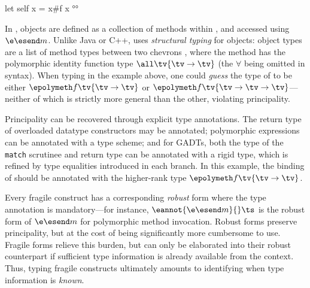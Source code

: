 \documentclass[acmsmall,screen,nonacm%
\Anonymous{,anonymous}{}%
\Final{}{,review}%
]{acmart}
\providecommand{\DIFaddbegin}{} %
\providecommand{\DIFaddend}{} %
\begin{document}
\vspace{1ex}
\DIFaddend \begin{program}[input]
let self x = x#f x °°
\end{program}
\DIFaddbegin 

\DIFaddend In \OCaml, objects are defined as a collection of methods within
, and accessed using $\e \esend m$. Unlike Java or C++,
\OCaml uses \emph{structural typing} for objects: object types are a list of
method types between two chevrons \eg {},
where the method  has the polymorphic identity function type
$\all \tv {\tv \to \tv}$ (the $\forall$ being omitted in \OCaml syntax).
%
When typing  in the example above, one could \emph{guess} the type
of  to be either $\epolymeth f \tv {\tv \to \tv}$ or $\epolymeth f \tv
{\tv \to \tv \to \tv}$---neither of which is strictly more general than the
other, violating principality.


Principality can be recovered through explicit type annotations. The return
type of overloaded datatype constructors may be annotated; polymorphic
expressions can be annotated with a type scheme; and for GADTs, both the type
of the \texttt{match} scrutinee and return type can be annotated with a rigid
type, which is refined by type equalities introduced in each branch.
In this example, the binding of  should be annotated with the
higher-rank type $\epolymeth f \tv {\tv \to \tv}$.


Every fragile construct has a corresponding \emph{robust} form where the type
annotation is mandatory---for instance, $\eannot {\e \esend m} {} \ts$ is the
robust form of $\e \esend  m$ for polymorphic method invocation.  Robust forms
preserve principality, but at the cost of being significantly more cumbersome
to use. Fragile forms relieve this burden, but can only be elaborated into
their robust counterpart if sufficient type information is already available
from the context. Thus, typing fragile constructs ultimately amounts to
identifying when type information is \emph{known}.

\end{document}
